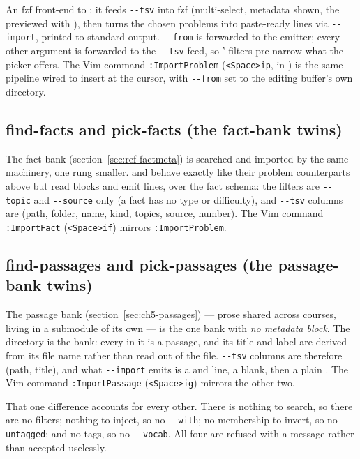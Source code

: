 An fzf front-end to : it feeds \texttt{-{}-tsv} into fzf
(multi-select, metadata shown, the  previewed with ), then
turns the chosen problems into paste-ready  lines via
\texttt{-{}-import}, printed to standard output. \texttt{-{}-from} is forwarded
to the emitter; every other argument is forwarded to the \texttt{-{}-tsv} feed,
so ' filters pre-narrow what the picker offers. The Vim
command \texttt{:ImportProblem} (\texttt{<Space>ip}, in
) is the same pipeline wired to insert at the
cursor, with \texttt{-{}-from} set to the editing buffer's own directory.

\subsection*{find-facts and pick-facts (the fact-bank twins)}

The fact bank (section~\ref{sec:ref-factmeta}) is searched and imported by the
same machinery, one rung smaller.  and  behave
exactly like their problem counterparts above but read  blocks and
emit  lines, over the fact schema: the filters are
\texttt{-{}-topic} and \texttt{-{}-source} only (a fact has no type or
difficulty), and \texttt{-{}-tsv} columns are
(path, folder, name, kind, topics, source, number). The Vim command \texttt{:ImportFact}
(\texttt{<Space>if}) mirrors \texttt{:ImportProblem}.

\subsection*{find-passages and pick-passages (the passage-bank twins)}

The passage bank (section~\ref{sec:ch5-passages}) --- prose shared across
courses, living in a submodule of its own --- is the one bank with
\emph{no metadata block}. The directory is the bank: every  in it is
a passage, and its title and label are derived from its file name rather than
read out of the file. \texttt{-{}-tsv} columns are therefore (path, title), and
what \texttt{-{}-import} emits is a  and  line, a blank,
then a plain . The Vim command \texttt{:ImportPassage}
(\texttt{<Space>ig}) mirrors the other two.

That one difference accounts for every other. There is nothing to search, so
there are no filters; nothing to inject, so no \texttt{-{}-with}; no membership
to invert, so no \texttt{-{}-untagged}; and no tags, so no \texttt{-{}-vocab}.
All four are refused with a message rather than accepted uselessly.

